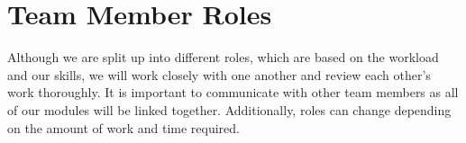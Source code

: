 \documentclass[12pt, titlepage]{article}
\begin{document}
\section{Team Member Roles}
Although we are split up into different roles, which are based on the workload and our skills, we will work closely with one another and review each other's work thoroughly. It is important to communicate with other team members as all of our modules will be linked together. Additionally, roles can change depending on the amount of work and time required. 
\begin{comment}
\begin{table}[]
	\centering
	\begin{tabular}{| m{5em} | m{4cm}| m{5cm} |}
	\hline
	Member						 & Role                                           & Description                                                                                                                                                                                                                \\ \hline
	Abraham Taha                 & Application Developer                          & This position is focused on creating a web application for the end user. This will allow the end user to interface with the hardware and change the sounds to detect.  \\ \hline
	Jordan Bierbrier             & Signal Processing / Embedded Systems Developer &                                                                                                                                                                                                      \\ \hline
	Taranjit Lotey               & Application Developer                          & Communication between application and hardware / backend development to send physical signals to user                                                                                                                      \\ \hline
	Azriel Gingoyon              & Hardware Developer                             & Cost-effective component research, wristband design, motor/microcontroller integration                                                                                                                                     \\ \hline
	Udeep Shah                   & Signal Processing / Embedded Systems Developer & Noise filtering, signal isolation resource optimization and power optimization                                                                                                                      \\ \hline
	\end{tabular}
\end{table}
\end{comment}
\end{document}

